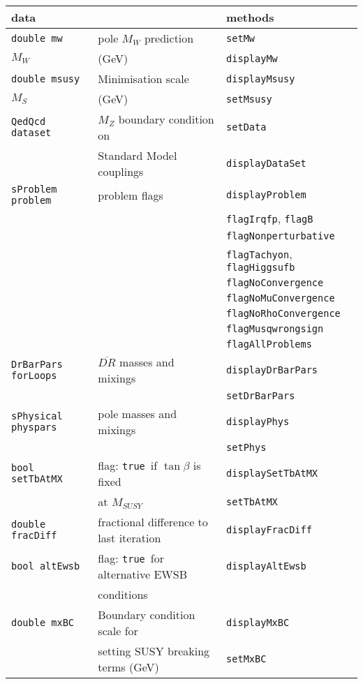 \documentclass[]{article}
\def\code#1{\small{\tt #1}\normalsize}
\begin{document}
\begin{table}\begin{center}\begin{tabular}{lll}      
data & & methods \\ \hline
\code{double mw} & pole $M_W$ prediction & \code{setMw} \\
$M_W$ & (GeV) & \code{displayMw} \\ \hline
\code{double msusy} & Minimisation scale & \code{displayMsusy} \\
$M_{S}$ & (GeV) & \code{setMsusy} \\ \hline
\code{QedQcd dataset} & $M_Z$ boundary condition on  &
\code{setData} \\
 & Standard Model couplings & \code{displayDataSet} \\ \hline
\code{sProblem problem} & problem flags & \code{displayProblem} \\
&& \code{flagIrqfp}, \code{flagB} \\
&& \code{flagNonperturbative} \\
&& \code{flagTachyon}, \code{flagHiggsufb} \\
&& \code{flagNoConvergence} \\
&& \code{flagNoMuConvergence} \\
&& \code{flagNoRhoConvergence} \\
&& \code{flagMusqwrongsign} \\
&& \code{flagAllProblems} \\ \hline
\code{DrBarPars forLoops} & $\overline{DR}$ masses and mixings& \code{displayDrBarPars} \\
 &  & \code{setDrBarPars} \\ \hline
\code{sPhysical physpars} & pole masses and mixings & \code{displayPhys}\\
 && \code{setPhys}\\ \hline
\code{bool setTbAtMX} & flag: \code{true}~if $\tan \beta$ is fixed  & \code{displaySetTbAtMX} \\
 &at
$M_{SUSY}$ & \code{setTbAtMX} \\ \hline
\code{double fracDiff} & fractional difference to last iteration &
\code{displayFracDiff} \\ \hline
\code{bool altEwsb} & flag: \code{true}~for alternative EWSB &
\code{displayAltEwsb} \\ 
& conditions & \\ \hline
\code{double mxBC} & Boundary condition scale for & \code{displayMxBC} \\
 & setting SUSY breaking terms (GeV) & \code{setMxBC} \\ \hline

\end{tabular}
\end{center}
\end{table}
\end{document}
